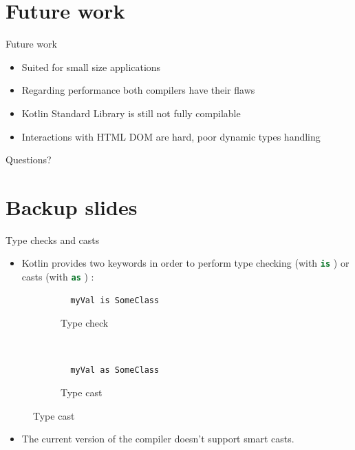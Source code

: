 \documentclass[10pt,usenames,dvipsnames]{beamer}
\newcommand{\inlinecode}[2]{\colorbox{minted-bg}{\lstinline[language=#1]$#2$}}
\newcommand{\ktinline}[1]{\inlinecode{kotlin}{#1}}
\begin{document}
\section{Future work}

\begin{frame}{Future work}
 \begin{itemize}
  \item Suited for small size applications
  \item Regarding performance both compilers have their flaws
  \item Kotlin Standard Library is still not fully compilable
  \item Interactions with HTML DOM are hard, poor dynamic types handling
 \end{itemize}

\end{frame}



\begin{frame}[standout]
  Questions?
\end{frame}

\appendix

\section{Backup slides}


\begin{frame}[fragile]{Type checks and casts}
 \begin{itemize}
  \item Kotlin provides two keywords in order to perform type checking (with \ktinline{is} ) or casts (with \ktinline{as} ) :
 \end{itemize}
 
  \begin{figure}
   \centering
   \begin{subfigure}[h]{0.45\textwidth}
      \begin{verbatim}
  myVal is SomeClass
      \end{verbatim}
      \caption*{Type check}
   \end{subfigure}
   ~
   \begin{subfigure}[h]{0.45\textwidth}
      \begin{verbatim}
  myVal as SomeClass
      \end{verbatim}
      \caption*{Type cast}
   \end{subfigure}

  \end{figure}
  \begin{itemize}
   \item The current version of the compiler doesn't support smart casts.
  \end{itemize}

\end{frame}
\end{document}
